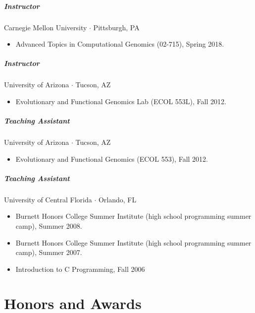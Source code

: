 \documentclass[10pt,letterpaper]{article}
\newcommand{\bigdot}{$\cdot$\xspace}
\begin{document}
\subparagraph{Instructor}  Carnegie Mellon University \bigdot Pittsburgh, PA
\begin{itemize}
    \item Advanced Topics in Computational Genomics (02-715), Spring 2018.
\end{itemize}

\subparagraph{Instructor} University of Arizona \bigdot Tucson, AZ
\begin{itemize}
    \item Evolutionary and Functional Genomics Lab (ECOL 553L), Fall 2012.
\end{itemize}

\subparagraph{Teaching Assistant}
University of Arizona \bigdot Tucson, AZ
\begin{itemize}
    \item Evolutionary and Functional Genomics (ECOL 553), Fall 2012.
\end{itemize}

\subparagraph{Teaching Assistant}
University of Central Florida \bigdot Orlando, FL
\begin{itemize}
    \item Burnett Honors College Summer Institute (high school programming summer camp), Summer 2008.
    \item Burnett Honors College Summer Institute (high school programming summer camp), Summer 2007.
    \item Introduction to C Programming, Fall 2006
\end{itemize}

\section*{Honors and Awards}
\end{document}

